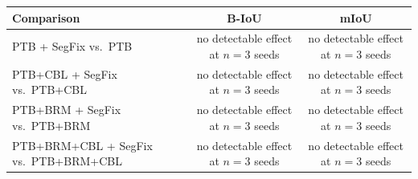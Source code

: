 \begin{tabular}{lcc}
\toprule
Comparison & B-IoU & mIoU \\
\midrule
PTB + SegFix vs.\ PTB & no detectable effect at $n{=}3$ seeds & no detectable effect at $n{=}3$ seeds \\
PTB+CBL + SegFix vs.\ PTB+CBL & no detectable effect at $n{=}3$ seeds & no detectable effect at $n{=}3$ seeds \\
PTB+BRM + SegFix vs.\ PTB+BRM & no detectable effect at $n{=}3$ seeds & no detectable effect at $n{=}3$ seeds \\
PTB+BRM+CBL + SegFix vs.\ PTB+BRM+CBL & no detectable effect at $n{=}3$ seeds & no detectable effect at $n{=}3$ seeds \\
\bottomrule
\end{tabular}
